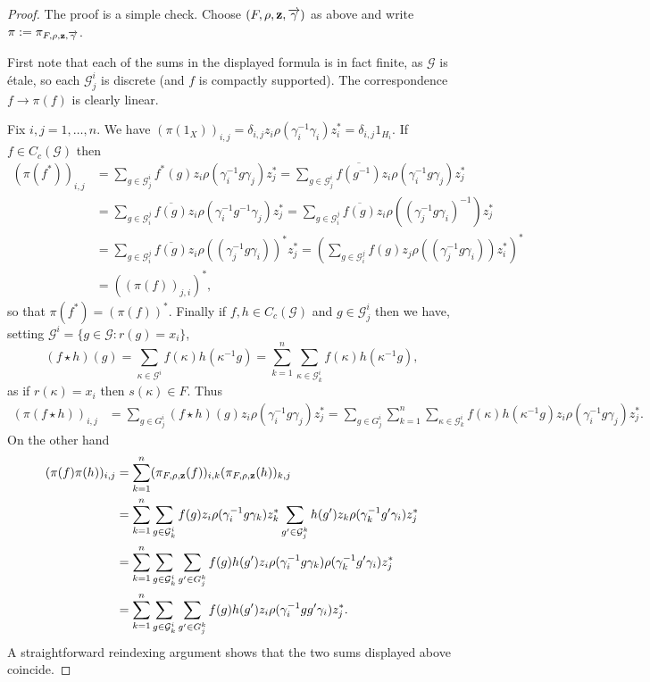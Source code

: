 \documentclass[10pt,a4paper]{amsart}
\newcommand{\GG}{\mathcal{G}}
\begin{document}
\begin{proof}
The proof is a simple check. Choose $(F, \rho, \bf{z}, \overrightarrow{\gamma})$ as above and  write $\pi:=\pi_{F, \rho, \bf{z}, \overrightarrow{\gamma}}$.
	
First note that each of the sums in the displayed formula is in fact finite, as $\GG$ is \'etale, so each $\GG_j^i$ is discrete (and $f$ is compactly supported). The correspondence $f\to \pi(f)$ is clearly linear.

Fix $i,j=1, \ldots, n$. We have  $(\pi(1_X))_{i,j}= \delta_{i,j} z_i \rho(\gamma_i^{-1}\gamma_i) z_i^* = \delta_{i,j} 1_{H_i}$. If $f \in C_c(\GG)$ then
\begin{align*}  (\pi (f^*))_{i,j} &= \sum_{g \in \GG_j^i} f^*(g) z_{i} \rho (\gamma_{i}^{-1}g \gamma_{j}) z_j^*
= \sum_{g \in \GG_j^i} \overline{f(g^{-1})} z_{i} \rho (\gamma_{i}^{-1}g \gamma_{j}) z_j^*
\\& = \sum_{g \in \GG_i^j} \overline{f(g)} z_{i} \rho (\gamma_{i}^{-1}g^{-1} \gamma_{j}) z_j^* =
 \sum_{g \in \GG_i^j} \overline{f(g)} z_{i} \rho ((\gamma_{j}^{-1}g \gamma_{i})^{-1}) z_j^*
\\&=
\sum_{g \in \GG_i^j} \overline{f(g)} z_{i} \rho ((\gamma_{j}^{-1}g \gamma_{i}))^* z_j^*
=
 \left( \sum_{g \in \GG_i^j} f(g) z_{j} \rho ((\gamma_{j}^{-1}g \gamma_{i})) z_i^* \right)^*
\\&= \left((\pi (f))_{j,i}\right)^*, \end{align*}
so that $\pi (f^*) = \left(\pi (f)\right)^*$.
Finally if $f, h\in C_c(\GG)$ and $g \in \GG_j^i$ then we have, setting $\GG^i=\{g \in \GG: r(g) =x_i\}$,
\[ (f\star h)(g) = \sum_{\kappa \in \GG^i} f(\kappa)h(\kappa^{-1}g) = \sum_{k=1}^n
\sum_{\kappa \in \GG_k ^i} f(\kappa)h(\kappa^{-1}g),\]
as if $r(\kappa)= x_i$ then $s(\kappa) \in F$. Thus
\begin{align*} (\pi (f\star h))_{i,j} &= \sum_{g \in G_j^i} (f \star h)(g) z_{i} \rho (\gamma_{i}^{-1}g \gamma_{j}) z_j^*
= \sum_{g \in G_j^i} \sum_{k=1}^n
\sum_{\kappa \in \GG_k^i} f(\kappa)h(\kappa^{-1}g) z_{i} \rho (\gamma_{i}^{-1}g \gamma_{j}) z_j^*.
\end{align*}
On the other hand
\begin{align*} (\pi (f)  \pi (h))_{i,j}
	&= \sum_{k=1}^n 	(\pi_{F, \rho, \bf{z}} (f))_{i,k}  (\pi_{F, \rho, \bf{z}} (h))_{k,j}
	\\&= \sum_{k=1}^n \sum_{g \in \GG_k^i} f(g) z_{i} \rho (\gamma_{i}^{-1}g \gamma_{k}) z_k^*
	\sum_{g'\in \GG_j^k} h(g') z_{k} \rho (\gamma_{k}^{-1}g' \gamma_{i}) z_j^*
	\\&=
\sum_{k=1}^n \sum_{g \in \GG_k^i} 	\sum_{g'\in G_j^k} f(g) h(g')  z_i \rho (\gamma_{i}^{-1}g \gamma_{k}) \rho (\gamma_{k}^{-1}g' \gamma_{i}) z_j^*
\\&=
\sum_{k=1}^n \sum_{g \in \GG_k^i} 	\sum_{g'\in G_j^k} f(g) h(g')  z_i \rho (\gamma_{i}^{-1}g g' \gamma_{i}) z_j^*.
\end{align*}	
A straightforward reindexing argument shows that the two  sums displayed above coincide.
\end{proof}
\end{document}

